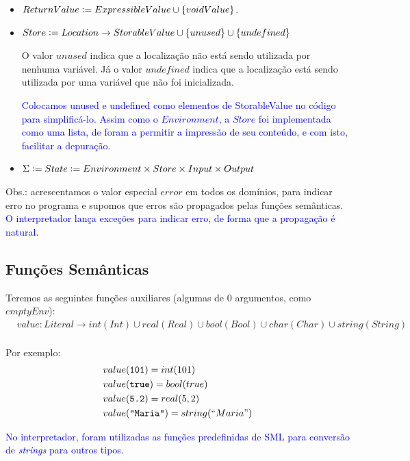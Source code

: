 \documentclass[12pt]{article}
\newcommand{\blu}{\textcolor{blue}}
\newcommand{\defeq}{\vcentcolon=}
\begin{document}
\begin{itemize}
\item $ReturnValue \defeq ExpressibleValue\cup \{voidValue\}$.

\item $Store \defeq Location\to StorableValue \cup \{unused\} \cup \{undefined\}$

O valor $unused$ indica que a localização não está sendo utilizada por nenhuma variável. Já o valor $undefined$ indica que a localização está sendo utilizada por uma variável que não foi inicializada.

\blu{Colocamos unused e undefined como elementos de StorableValue no código para simplificá-lo. Assim como o $Environment$, a $Store$ foi implementada como uma lista, de foram a permitir a impressão de seu conteúdo, e com isto, facilitar a depuração}.


\item $\Sigma \defeq State \defeq Environment \times Store \times Input \times Output$

\end{itemize}

Obs.: acrescentamos o valor especial $error$ em todos os domínios, para indicar erro no programa e supomos que erros são propagados pelas funções semânticas. \blu{O interpretador lança exceções para indicar erro, de forma que a propagação é natural.}

\subsection{Funções Semânticas}
Teremos as seguintes funções auxiliares (algumas de $0$ argumentos, como $emptyEnv$):
\begin{align*}
&value:Literal\to int(Int)\cup real(Real)\cup bool(Bool)\cup  char(Char)\cup string(String) \\
\end{align*}

Por exemplo:
\begin{align*}
&value(\text{{\tt 101}}) = int(101) \\
&value(\text{{\tt true}}) = bool(true) \\
&value(\text{{\tt 5.2}}) = real(5,2) \\
&value(\text{{\tt "Maria"}}) = string(``Maria") \\
\end{align*}

\blu{No interpretador, foram utilizadas as funções predefinidas de SML para conversão de \textit{strings} para outros tipos.}
\end{document}

